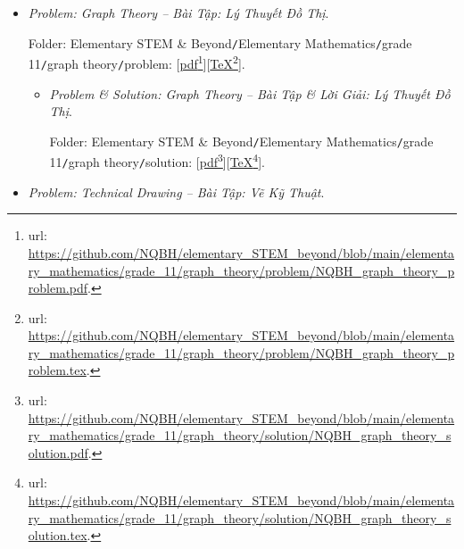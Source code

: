 \documentclass[12pt]{article}
\begin{document}
\begin{itemize}
\begin{itemize}
		Folder: {\sf Elementary STEM \& Beyond{\tt/}Elementary Mathematics{\tt/}grade 11{\tt/}geometrical transformation{\tt/}solution}: [\href{https://github.com/NQBH/elementary_STEM_beyond/blob/main/elementary_mathematics/grade_11/geometrical_transformation/solution/NQBH_geometrical_transformation_solution.pdf}{pdf}\footnote{{\sc url}: \url{https://github.com/NQBH/elementary_STEM_beyond/blob/main/elementary_mathematics/grade_11/geometrical_transformation/solution/NQBH_geometrical_transformation_solution.pdf}.}][\href{https://github.com/NQBH/elementary_STEM_beyond/blob/main/elementary_mathematics/grade_11/geometrical_transformation/solution/NQBH_geometrical_transformation_solution.tex}{\TeX}\footnote{{\sc url}: \url{https://github.com/NQBH/elementary_STEM_beyond/blob/main/elementary_mathematics/grade_11/geometrical_transformation/solution/NQBH_geometrical_transformation_solution.tex}.}].		
	\end{itemize}
	\item {\it Problem: Graph Theory -- Bài Tập: Lý Thuyết Đồ Thị}.
	
	Folder: {\sf Elementary STEM \& Beyond{\tt/}Elementary Mathematics{\tt/}grade 11{\tt/}graph theory{\tt/}problem}: [\href{https://github.com/NQBH/elementary_STEM_beyond/blob/main/elementary_mathematics/grade_11/graph_theory/problem/NQBH_graph_theory_problem.pdf}{pdf}\footnote{{\sc url}: \url{https://github.com/NQBH/elementary_STEM_beyond/blob/main/elementary_mathematics/grade_11/graph_theory/problem/NQBH_graph_theory_problem.pdf}.}][\href{https://github.com/NQBH/elementary_STEM_beyond/blob/main/elementary_mathematics/grade_11/graph_theory/problem/NQBH_graph_theory_problem.tex}{\TeX}\footnote{{\sc url}: \url{https://github.com/NQBH/elementary_STEM_beyond/blob/main/elementary_mathematics/grade_11/graph_theory/problem/NQBH_graph_theory_problem.tex}.}].
	\begin{itemize}
		\item {\it Problem \& Solution: Graph Theory -- Bài Tập \& Lời Giải: Lý Thuyết Đồ Thị}.
		
		Folder: {\sf Elementary STEM \& Beyond{\tt/}Elementary Mathematics{\tt/}grade 11{\tt/}graph theory{\tt/}solution}: [\href{https://github.com/NQBH/elementary_STEM_beyond/blob/main/elementary_mathematics/grade_11/graph_theory/solution/NQBH_graph_theory_solution.pdf}{pdf}\footnote{{\sc url}: \url{https://github.com/NQBH/elementary_STEM_beyond/blob/main/elementary_mathematics/grade_11/graph_theory/solution/NQBH_graph_theory_solution.pdf}.}][\href{https://github.com/NQBH/elementary_STEM_beyond/blob/main/elementary_mathematics/grade_11/graph_theory/solution/NQBH_graph_theory_solution.tex}{\TeX}\footnote{{\sc url}: \url{https://github.com/NQBH/elementary_STEM_beyond/blob/main/elementary_mathematics/grade_11/graph_theory/solution/NQBH_graph_theory_solution.tex}.}].
	\end{itemize}
	\item {\it Problem: Technical Drawing -- Bài Tập: Vẽ Kỹ Thuật}.
	

\end{itemize}
\end{document}
